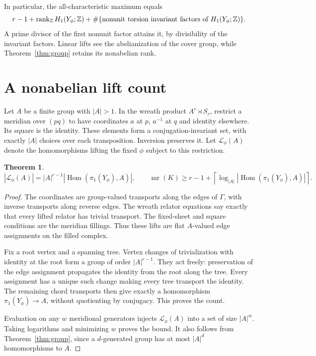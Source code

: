 \documentclass[11pt]{article}
\newtheorem{theorem}{Theorem}
\newcommand{\mr}{\operatorname{mr}}
\newcommand{\rk}{\operatorname{rank}}
\newcommand{\Hom}{\operatorname{Hom}}
\newcommand{\Z}{\mathbb Z}
\begin{document}
In particular, the all-characteristic maximum equals
\[
 r-1+\rk_\Z H_1(Y_\phi;\Z)
       +\#\{\hbox{nonunit torsion invariant factors of }H_1(Y_\phi;\Z)\}.
\]
A prime divisor of the first nonunit factor attains it, by divisibility
of the invariant factors. Linear lifts see the abelianization of the
cover group, while Theorem~\ref{thm:group} retains its nonabelian rank.

\section{A nonabelian lift count}

Let $A$ be a finite group with $|A|>1$. In the wreath product
$A^r\rtimes S_r$, restrict a meridian over $(pq)$ to have coordinates
$a$ at $p$, $a^{-1}$ at $q$ and identity elsewhere. Its square is the
identity. These elements form a conjugation-invariant set, with
exactly $|A|$ choices over each transposition. Inversion preserves it.
Let $\mathcal L_\phi(A)$ denote the homomorphisms lifting the fixed
$\phi$ subject to this restriction.

\begin{theorem}\label{thm:nonabelian}
\[
 |\mathcal L_\phi(A)|=|A|^{r-1}|\Hom(\pi_1(Y_\phi),A)|,
 \qquad
 \mr(K)\ge r-1+
 \left\lceil\log_{|A|}|\Hom(\pi_1(Y_\phi),A)|\right\rceil.
\]
\end{theorem}
\begin{proof}
The coordinates are group-valued transports along the edges of
$\Gamma$, with inverse transports along reverse edges. The wreath
relator equations say exactly that every lifted relator has trivial
transport. The fixed-sheet and square conditions are the meridian
fillings. Thus these lifts are flat $A$-valued edge assignments on the
filled complex.

Fix a root vertex and a spanning tree. Vertex changes of trivialization
with identity at the root form a group of order $|A|^{r-1}$. They act
freely: preservation of the edge assignment propagates the identity
from the root along the tree. Every assignment has a unique such
change making every tree transport the identity. The remaining chord
transports then give exactly a homomorphism $\pi_1(Y_\phi)\to A$,
without quotienting by conjugacy. This proves the count.

Evaluation on any $w$ meridional generators injects
$\mathcal L_\phi(A)$ into a set of size $|A|^w$. Taking logarithms and
minimizing $w$ proves the bound. It also follows from
Theorem~\ref{thm:group}, since a $d$-generated group has at most $|A|^d$
homomorphisms to $A$.
\end{proof}
\end{document}
